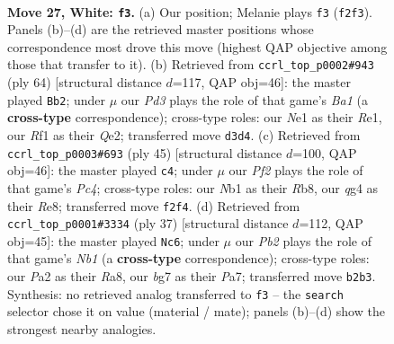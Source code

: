 \documentclass[11pt]{article}
\begin{document}
\clearpage

\begin{figure}[p]\centering
\begin{subfigure}{0.46\textwidth}\centering
\resizebox{\linewidth}{!}{%
\newchessgame
\chessboard[
  setfen={nrbr2k1/5pb1/p6p/2p1p3/1p2P1qn/3P4/PPQB1PB1/RN2NRK1 w - - 2 27},
  showmover=false,
  pgfstyle=straightmove, color=movearrow, markmove={f2-f3}
]}
\caption{}
\end{subfigure}\hfill
\begin{subfigure}{0.46\textwidth}\centering
\resizebox{\linewidth}{!}{%
\newchessgame
\chessboard[
  setfen={2r3k1/1b2rpb1/3q1npp/1p2p3/1P2P3/1R1B1NPP/4QPK1/B3R3 w - - 6 33},
  showmover=false,
  pgfstyle=straightmove, color=movearrow, markmove={a1-b2}
]}
\caption{}
\end{subfigure}
\\[4pt]
\begin{subfigure}{0.46\textwidth}\centering
\resizebox{\linewidth}{!}{%
\newchessgame
\chessboard[
  setfen={1r1qrbk1/3b2p1/p4n1p/n1p1N3/Pp6/2P4P/1PBN2P1/R1BQR1K1 b - - 3 23},
  showmover=false,
  pgfstyle=straightmove, color=movearrow, markmove={c5-c4}
]}
\caption{}
\end{subfigure}\hfill
\begin{subfigure}{0.46\textwidth}\centering
\resizebox{\linewidth}{!}{%
\newchessgame
\chessboard[
  setfen={rnr2k2/p2q1ppB/4p3/2bnP1NQ/2b5/P7/5PPP/R1B1R1K1 b - - 1 19},
  showmover=false,
  pgfstyle=straightmove, color=movearrow, markmove={b8-c6}
]}
\caption{}
\end{subfigure}
\caption{\textbf{Move 27, White: \texttt{f3}.} (a) Our position; Melanie plays \texttt{f3} (\texttt{f2f3}). Panels (b)--(d) are the retrieved master positions whose correspondence most drove this move (highest QAP objective among those that transfer to it). (b) Retrieved from \texttt{ccrl\_top\_p0002\#943} (ply 64) [structural distance $d$=117, QAP obj=46]: the master played \texttt{Bb2}; under $\mu$ our \emph{Pd3} plays the role of that game's \emph{Ba1} (a \textbf{cross-type} correspondence); cross-type roles: our \emph{N}e1 as their \emph{R}e1, our \emph{R}f1 as their \emph{Q}e2; transferred move \texttt{d3d4}. (c) Retrieved from \texttt{ccrl\_top\_p0003\#693} (ply 45) [structural distance $d$=100, QAP obj=46]: the master played \texttt{c4}; under $\mu$ our \emph{Pf2} plays the role of that game's \emph{Pc4}; cross-type roles: our \emph{N}b1 as their \emph{R}b8, our \emph{q}g4 as their \emph{R}e8; transferred move \texttt{f2f4}. (d) Retrieved from \texttt{ccrl\_top\_p0001\#3334} (ply 37) [structural distance $d$=112, QAP obj=45]: the master played \texttt{Nc6}; under $\mu$ our \emph{Pb2} plays the role of that game's \emph{Nb1} (a \textbf{cross-type} correspondence); cross-type roles: our \emph{P}a2 as their \emph{R}a8, our \emph{b}g7 as their \emph{P}a7; transferred move \texttt{b2b3}. Synthesis: no retrieved analog transferred to \texttt{f3} -- the \texttt{search} selector chose it on value (material / mate); panels (b)--(d) show the strongest nearby analogies.}
\label{fig:thought-m52}
\end{figure}
\end{document}
